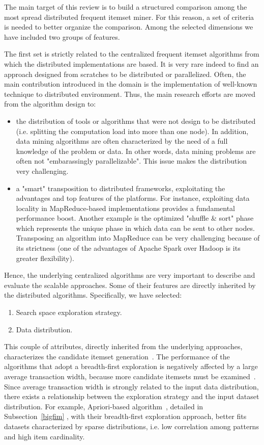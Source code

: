 The main target of this review is to build a structured comparison among the most spread distributed frequent itemset miner. For this reason, a set of criteria is needed to better organize the comparison. Among the selected dimensions we have included two groups of features.

The first set is strictly related to the centralized frequent itemset algorithms from which the distributed implementations are based. It is very rare indeed to find an approach designed from scratches to be distributed or parallelized. Often, the main contribution introduced in the domain is the implementation of well-known technique to distributed environment. Thus, the main research efforts are moved from the algorithm design to:
\begin{itemize}
\item the distribution of tools or algorithms that were not design to be distributed (i.e. splitting the computation load into more than one node). In addition, data mining algorithms are often characterized by the need of a full knowledge of the problem or data. In other words, data mining problems are often not "embarassingly parallelizable". This issue makes the distribution very challenging.
\item a "smart" transposition to distributed frameworks, exploitating the advantages and top features of the platforms. For instance, exploiting data locality in MapReduce-based implementations provides a fundamental performance boost. Another example is the optimized "shuffle \& sort" phase which represents the unique phase in which data can be sent to other nodes. Transposing an algorithm into MapReduce can be very challenging because of its strictness (one of the advantages of Apache Spark over Hadoop is its greater flexibility).
\end{itemize}
Hence, the underlying centralized algorithms are very important to describe and evaluate the scalable approaches. Some of their features are directly inherited by the distributed algorithms. Specifically, we have selected:
\begin{enumerate}
\item Search space exploration strategy.
\item Data distribution. 
\end{enumerate}
This couple of attributes, directly inherited from the underlying approaches, characterizes the candidate itemset generation~\cite{goethals2003survey}. The performance of the algorithms that adopt a breadth-first exploration is negatively affected by a large average transaction width, because more candidate itemsets must be examined~\cite{KumarBook}. Since average transaction width is strongly related to the input data distribution, there exists a relationship between the exploration strategy and the input dataset distribution. For example, Apriori-based algorithm~\cite{Agr94}, detailed in Subsection~\ref{bigfim} , with their breadth-first exploration approach, better fits datasets characterized by sparse distributions, i.e. low correlation among patterns and high item cardinality.

